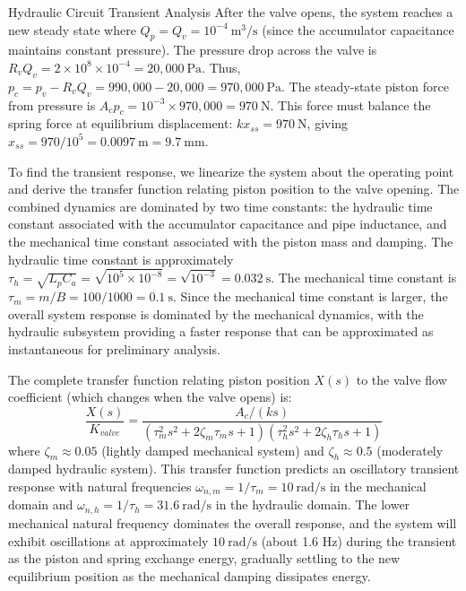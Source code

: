 \begin{example}{Hydraulic Circuit Transient Analysis}
After the valve opens, the system reaches a new steady state where $Q_p = Q_v = 10^{-4}\ \text{m}^3/\text{s}$ (since the accumulator capacitance maintains constant pressure). The pressure drop across the valve is $R_v Q_v = 2 \times 10^8 \times 10^{-4} = 20,000\ \text{Pa}$. Thus, $p_c = p_v - R_v Q_v = 990,000 - 20,000 = 970,000\ \text{Pa}$. The steady-state piston force from pressure is $A_c p_c = 10^{-3} \times 970,000 = 970\ \text{N}$. This force must balance the spring force at equilibrium displacement: $kx_{ss} = 970\ \text{N}$, giving $x_{ss} = 970 / 10^5 = 0.0097\ \text{m} = 9.7\ \text{mm}$.

To find the transient response, we linearize the system about the operating point and derive the transfer function relating piston position to the valve opening. The combined dynamics are dominated by two time constants: the hydraulic time constant associated with the accumulator capacitance and pipe inductance, and the mechanical time constant associated with the piston mass and damping. The hydraulic time constant is approximately $\tau_h = \sqrt{L_p C_a} = \sqrt{10^5 \times 10^{-8}} = \sqrt{10^{-3}} = 0.032\ \text{s}$. The mechanical time constant is $\tau_m = m/B = 100/1000 = 0.1\ \text{s}$. Since the mechanical time constant is larger, the overall system response is dominated by the mechanical dynamics, with the hydraulic subsystem providing a faster response that can be approximated as instantaneous for preliminary analysis.

The complete transfer function relating piston position $X(s)$ to the valve flow coefficient (which changes when the valve opens) is:
\begin{equation}
\frac{X(s)}{K_{valve}} = \frac{A_c / (k s)}{(\tau_m^2 s^2 + 2\zeta_m \tau_m s + 1)(\tau_h^2 s^2 + 2\zeta_h \tau_h s + 1)}
\end{equation}
where $\zeta_m \approx 0.05$ (lightly damped mechanical system) and $\zeta_h \approx 0.5$ (moderately damped hydraulic system). This transfer function predicts an oscillatory transient response with natural frequencies $\omega_{n,m} = 1/\tau_m = 10\ \text{rad/s}$ in the mechanical domain and $\omega_{n,h} = 1/\tau_h = 31.6\ \text{rad/s}$ in the hydraulic domain. The lower mechanical natural frequency dominates the overall response, and the system will exhibit oscillations at approximately $10\ \text{rad/s}$ (about 1.6 Hz) during the transient as the piston and spring exchange energy, gradually settling to the new equilibrium position as the mechanical damping dissipates energy.
\end{example}

